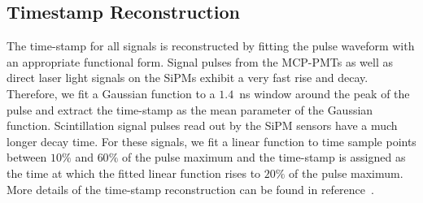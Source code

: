 \subsection{Timestamp Reconstruction} \label{sec:reco} The time-stamp for all
signals is reconstructed by fitting the pulse waveform with an appropriate
functional form. Signal pulses from the MCP-PMTs as well as direct laser light
signals on the SiPMs exhibit a very fast rise and decay. Therefore, we fit a
Gaussian function to a $1.4$~ns window around the peak of the pulse and extract
the time-stamp as the mean parameter of the Gaussian function. Scintillation
signal pulses read out by the SiPM sensors have a much longer decay time. For
these signals, we fit a linear function to time sample points between $10\%$ and
$60\%$ of the pulse maximum and the time-stamp is assigned as the time at which
the fitted linear function rises to $20\%$ of the pulse maximum. More details of
the time-stamp reconstruction can be found in reference~\cite{Anderson:2015gha}.

